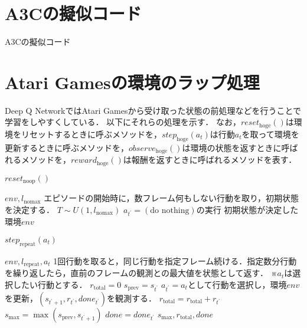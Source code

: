 \documentclass{jarticle}
\begin{document}
\section{A3Cの擬似コード}
\begin{algorithm}[htb]
\caption{A3Cの擬似コード}
\label{alg:a3c}                          
\begin{algorithmic}[1]   
\REQUIRE 
\ENSURE
\end{algorithmic}
\end{algorithm}


\section{Atari Gamesの環境のラップ処理}
Deep Q NetworkではAtari Gamesから受け取った状態の前処理などを行うことで学習をしやすくしている．
以下にそれらの処理を示す．
なお，$reset_{\mathrm{hoge}}()$は環境をリセットするときに呼ぶメソッドを，$step_{\mathrm{hoge}}(a_t)$は行動$a_t$を取って環境を更新するときに呼ぶメソッドを，$observe_{\mathrm{hoge}}()$は環境の状態を返すときに呼ばれるメソッドを，$reward_{\mathrm{hoge}}()$は報酬を返すときに呼ばれるメソッドを表す．
\begin{algorithm}[htb]
\caption{$reset_{\mathrm{noop}}()$}
\label{alg:noop_reset}                          
\begin{algorithmic}[1]   
\REQUIRE $env, l_{\mathrm{nomax}}$
\STATE エピソードの開始時に，数フレーム何もしない行動を取り，初期状態を決定する．
\STATE $T\sim U(1,l_{\mathrm{nomax}})$
\STATE $a_{t^{\prime}}=(\mbox{do nothing})$の実行
\ENDFOR
\ENSURE 初期状態が決定した環境$env$
\end{algorithmic}
\end{algorithm}

\begin{algorithm}[tb]
\caption{$step_{\mathrm{repeat}}(a_t)$}
\label{alg:max_and_skip}                          
\begin{algorithmic}[1]   
\REQUIRE $env, l_{\mathrm{repeat}}, a_t$
\STATE 1回行動を取ると，同じ行動を指定フレーム続ける．指定数分行動を繰り返したら，直前のフレームの観測との最大値を状態として返す．
\STATE ※$a_t$は選択したい行動とする．
\STATE $r_{\mathrm{total}}=0$
\STATE $s_{\mathrm{prev}}=s_{t^{\prime}}$
\STATE $a_{t^{\prime}}=a_t$として行動を選択し，環境$env$を更新，$(s_{t^{\prime}+1},r_{t^{\prime}}, done_{t^{\prime}})$を観測する．
\STATE $r_{\mathrm{total}}=r_{\mathrm{total}}+r_{t^{\prime}}$
\STATE $s_{\mathrm{max}}=\max(s_{\mathrm{prev}}, s_{t^{\prime}+1})$
\STATE $done=done_{t^{\prime}}$
\ENDFOR
\ENSURE $s_{\mathrm{max}}, r_{\mathrm{total}}, done$
\end{algorithmic}
\end{algorithm}
\end{document}
